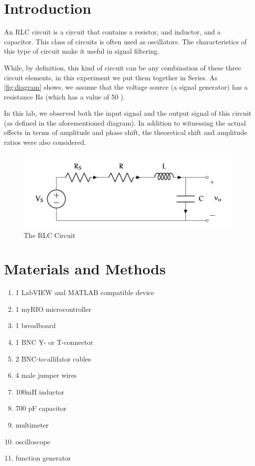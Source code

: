 \documentclass[10pt,twocolumn]{article}
\begin{document}
\section{Introduction} 
\label{sec:introduction}

An RLC circuit is a circuit that contains a resistor, and inductor, and a capacitor. This class of circuits is often used as oscillators. The characteristics of this type of circuit make it useful in signal filtering.

While, by definition, this kind of circuit can be any combination of these three circuit elements, in this experiment we put them together in Series. As \autoref{fig:diagram} shows, we assume that the voltage source (a signal generator) has a resistance Rs (which has a value of 50 \Omega).

In this lab, we observed both the input signal and the output signal of this circuit (as defined in the aforementioned diagram). In addition to witnessing the actual effects in terms of amplitude and phase shift, the theoretical shift and amplitude ratios were also considered.

\begin{figure}[bt]
	\centering
	\includegraphics[width=.9\linewidth]{figures/RLCDiagram.JPG}
	\caption{The RLC Circuit}
	\label{fig:diagram}
\end{figure}

\section{Materials and Methods}

\begin{enumerate}
\item 
1 LabVIEW and MATLAB compatible device 
\item 
1 myRIO microcontroller
\item
1 breadboard
\item
1 BNC Y- or T-connector
\item
2 BNC-to-allifator cables
\item
4 male jumper wires
\item
100mH inductor
\item
700 pF capacitor
\item
multimeter
\item
oscilloscope
\item
function generator
\end{enumerate}
\end{document}
